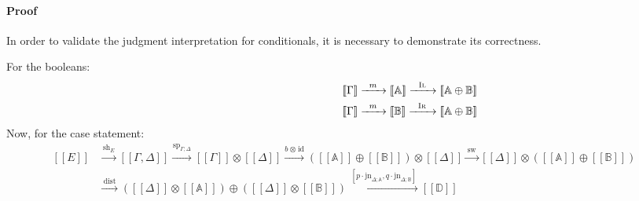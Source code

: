 \paragraph{Proof} In order to validate the judgment interpretation for conditionals, it is necessary to demonstrate its correctness.

For the booleans: 
\begin{equation} \label{eq:proof_bool}
 \begin{aligned} 
    \hspace{120pt}&  [\![\Gamma ]\!]   \xrightarrow{\hspace{5pt}m\hspace{5pt}} [\![\mathbb{A} ]\!] \xrightarrow{\hspace{6pt}\textsc{Il}\hspace{6pt}} [\![\mathbb{A} \oplus \mathbb{B}]\!] \\ 
     &[\![\Gamma ]\!]   \xrightarrow{\hspace{5pt}m\hspace{5pt}} [\![\mathbb{B} ]\!] \xrightarrow{\hspace{6pt}\textsc{Ir}\hspace{6pt}} [\![\mathbb{A} \oplus \mathbb{B}]\!]
\end{aligned}   
\end{equation}
Now, for the case statement:
\begin{equation} \label{eq:proof_bool_2}
 \begin{aligned} 
    [\![E]\!] & \xrightarrow{\hspace{2pt}\text{sh}_{E}\hspace{2pt}}   [\![\Gamma,\Delta ]\!]   \xrightarrow{\hspace{1pt}\text{sp}_{\Gamma;\Delta}\hspace{1pt}}  [\![\Gamma ]\!] \otimes [\![\Delta ]\!] \xrightarrow{ b \hspace{1pt} \otimes \hspace{1pt} \text{id}} ([\![\mathbb{A} ]\!] \oplus [\![\mathbb{B} ]\!]) \otimes [\![\Delta ]\!] \xrightarrow{\hspace{2pt}\text{sw}\hspace{2pt}}  [\![\Delta ]\!] \otimes ([\![\mathbb{A} ]\!] \oplus [\![\mathbb{B} ]\!])  \\
    & \xrightarrow{\hspace{3pt}\text{dist}\hspace{3pt}} ([\![\Delta ]\!] \otimes [\![\mathbb{A} ]\!]  ) \oplus (  [\![\Delta ]\!] \otimes [\![\mathbb{B} ]\!] ) \xrightarrow{\hspace{2pt}[p \cdot \text{jn}_{\Delta;\mathbb{A}},q \cdot \text{jn}_{\Delta;\mathbb{B}}]\hspace{2pt}} [\![\mathbb{D} ]\!]
\end{aligned}   
\end{equation}


